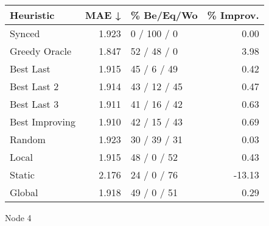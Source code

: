 \begin{tabular}{lrlr}
\toprule
\textbf{Heuristic} & \textbf{MAE ↓} & \textbf{\% Be/Eq/Wo} & \textbf{\% Improv.} \\
\midrule
            Synced &          1.923 &          0 / 100 / 0 &                0.00 \\
     Greedy Oracle &          1.847 &          52 / 48 / 0 &                3.98 \\
         Best Last &          1.915 &          45 / 6 / 49 &                0.42 \\
       Best Last 2 &          1.914 &         43 / 12 / 45 &                0.47 \\
       Best Last 3 &          1.911 &         41 / 16 / 42 &                0.63 \\
    Best Improving &          1.910 &         42 / 15 / 43 &                0.69 \\
            Random &          1.923 &         30 / 39 / 31 &                0.03 \\
             Local &          1.915 &          48 / 0 / 52 &                0.43 \\
            Static &          2.176 &          24 / 0 / 76 &              -13.13 \\
            Global &          1.918 &          49 / 0 / 51 &                0.29 \\
\bottomrule
\end{tabular}
\caption{Node 4}
\label{tab:ds_iid_lr05_le1_bs2_4}
